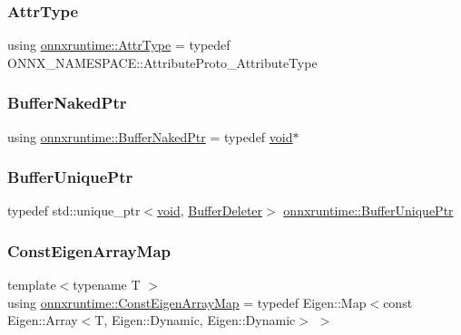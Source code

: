 \subsubsection{\texorpdfstring{Attr\+Type}{AttrType}}
{\footnotesize\ttfamily using \mbox{\hyperlink{namespaceonnxruntime_afb993460ae8432beef9db5f0cf10ca7c}{onnxruntime\+::\+Attr\+Type}} = typedef O\+N\+N\+X\+\_\+\+N\+A\+M\+E\+S\+P\+A\+C\+E\+::\+Attribute\+Proto\+\_\+\+Attribute\+Type}

\mbox{\label{namespaceonnxruntime_a1077ff17fe9e6d571cea3082b9e3a22b}} 
\subsubsection{\texorpdfstring{Buffer\+Naked\+Ptr}{BufferNakedPtr}}
{\footnotesize\ttfamily using \mbox{\hyperlink{namespaceonnxruntime_a1077ff17fe9e6d571cea3082b9e3a22b}{onnxruntime\+::\+Buffer\+Naked\+Ptr}} = typedef \mbox{\hyperlink{mlasi_8h_a88f941d423cb2a819b70a1358982b1a6}{void}}$\ast$}

\mbox{\label{namespaceonnxruntime_acd830c816d6e0699b671f8ba79bb48f9}} 
\subsubsection{\texorpdfstring{Buffer\+Unique\+Ptr}{BufferUniquePtr}}
{\footnotesize\ttfamily typedef std\+::unique\+\_\+ptr$<$\mbox{\hyperlink{mlasi_8h_a88f941d423cb2a819b70a1358982b1a6}{void}}, \mbox{\hyperlink{classonnxruntime_1_1BufferDeleter}{Buffer\+Deleter}}$>$ \mbox{\hyperlink{namespaceonnxruntime_acd830c816d6e0699b671f8ba79bb48f9}{onnxruntime\+::\+Buffer\+Unique\+Ptr}}}

\mbox{\label{namespaceonnxruntime_ab232876005b857fa427aead37e418c50}} 
\subsubsection{\texorpdfstring{Const\+Eigen\+Array\+Map}{ConstEigenArrayMap}}
{\footnotesize\ttfamily template$<$typename T $>$ \\
using \mbox{\hyperlink{namespaceonnxruntime_ab232876005b857fa427aead37e418c50}{onnxruntime\+::\+Const\+Eigen\+Array\+Map}} = typedef Eigen\+::\+Map$<$const Eigen\+::\+Array$<$T, Eigen\+::\+Dynamic, Eigen\+::\+Dynamic$>$ $>$}

